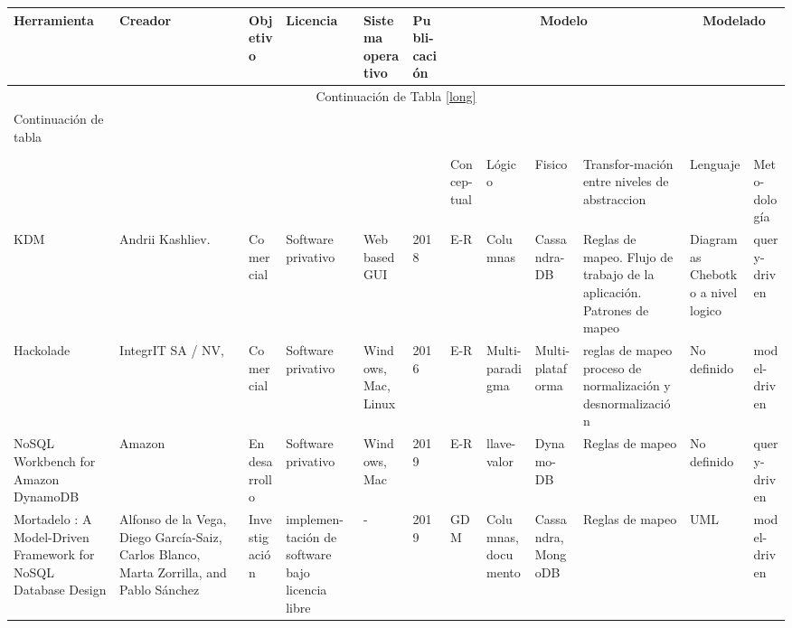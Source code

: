 
\begin{landscape}
	
	\begin{longtable}{  p{2.6cm}| p{1.7cm}| l| p{1.8cm}| p{1.7cm}|  p{1.1cm}| p{1.2cm}| p{1.7cm}| p{1.9cm}| p{1.6cm}| p{1.5cm}| p{1.5cm}  }
		
		
		\hline
		
		\textbf{Herramienta} & \textbf{Creador} & \textbf{Objetivo} & \textbf{Licencia}& \textbf{Sistema operativo} & \textbf{Publi-cación } & \multicolumn{4}{|c|}{\textbf{Modelo}}  & \multicolumn{2}{|c}{\textbf{Modelado}}\\
		
		\endfirsthead
		
		\multicolumn{12}{c}{Continuación de Tabla \ref{long}}\\
		\hline
		Continuación de tabla\\
		\hline
		\endhead
		
		\hline
		\endfoot
		
		\hline
		\multicolumn{12}{ c }{Fin de Tabla}\\
		\hline%
		\endlastfoot
		
		
		&  &  &  &  &  & Concep-tual & Lógico & Fisico &  
		Transfor-mación entre niveles de abstraccion
		& Lenguaje & Meto-dología\\
		\hline
		
		KDM & Andrii Kashliev. & Comercial & Software privativo & Web based GUI & 2018 & E-R & Columnas & Cassandra-DB& Reglas de mapeo. Flujo de trabajo de la aplicación. Patrones de mapeo & Diagramas Chebotko a nivel logico & query-driven\\
		
		
		
		Hackolade & IntegrIT SA / NV, & Comercial & Software privativo & Windows, Mac, Linux & 2016 & E-R & Multi-paradigma & Multi-plataforma & reglas de mapeo proceso de  normalización y desnormalización& No definido & model-driven \\
		
		NoSQL Workbench for Amazon DynamoDB & Amazon & En desarrollo & Software privativo & Windows, Mac & 2019 & E-R & llave- valor & Dynamo-DB & Reglas de mapeo & No definido &  query-driven \\
		
		
		Mortadelo : A Model-Driven Framework for NoSQL Database Design &  
		Alfonso de la Vega, Diego García-Saiz, Carlos Blanco, Marta Zorrilla, and Pablo Sánchez & Investigación &  
		implemen-tación de software bajo licencia libre & - & 2019 & GDM &  Columnas, documento &  
		Cassandra, MongoDB &  Reglas de mapeo & UML & model-driven  \\
		

\end{longtable}
\end{landscape}
